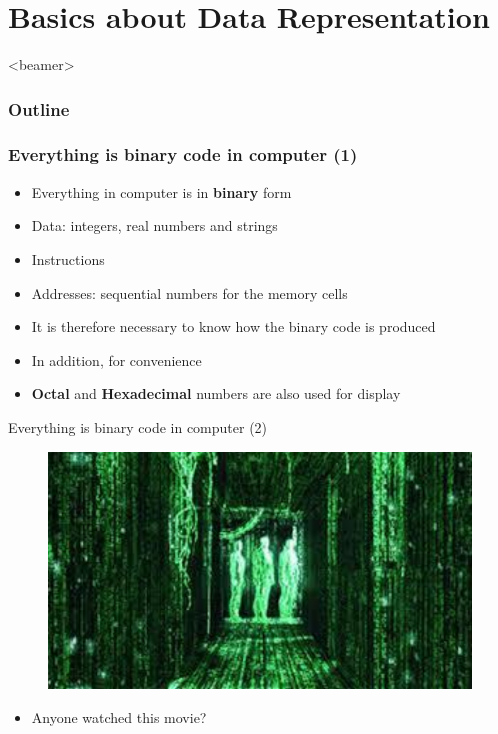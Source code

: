 \section{Basics about Data Representation}
\label{sec:basic}
\begin{frame}<beamer>
    \frametitle{Outline}
    \tableofcontents[currentsection]
\end{frame}


\begin{frame}
\frametitle{Everything is binary code in computer (1)}
	\begin{itemize}
		\item {Everything in computer is in \textbf{binary} form}
		\item {Data: integers, real numbers and strings}
		\item {Instructions}
		\item {Addresses: sequential numbers for the memory cells}
	\end{itemize}
	\begin{itemize}
		\item {It is therefore necessary to know how the binary code is produced}
		\item {In addition, for convenience}
		\item {\textbf{Octal} and \textbf{Hexadecimal} numbers are also used for display}
	\end{itemize}
\end{frame}

\begin{frame}{Everything is binary code in computer (2)}
	\begin{figure}
			\includegraphics[width=0.6\linewidth]{figs/matrix.pdf}
	\end{figure}
	\begin{itemize}
		\item {Anyone watched this movie?}
	\end{itemize}
\end{frame}

